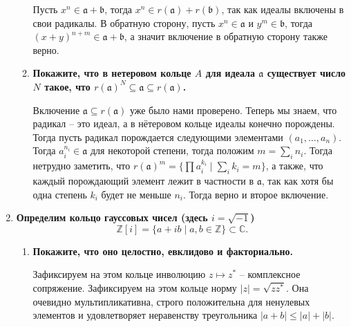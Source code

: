 \documentclass{article}
\begin{document}
\begin{enumerate}
\begin{enumerate}
                Пусть $x^n\in\mathfrak{a}+\mathfrak{b}$, тогда $x^n\in
                r(\mathfrak{a})+r(\mathfrak{b})$, так как идеалы включены в свои
                радикалы. В обратную сторону, пусть $x^n\in\mathfrak{a}$ и
                $y^m\in\mathfrak{b}$, тогда $(x+y)^{n+m}\in\mathfrak{a}+\mathfrak{b}$,
                а значит включение в обратную сторону также верно.

            \item \textbf{Покажите, что в нетеровом кольце $A$ для идеала $\mathfrak{a}$
                существует число $N$ такое, что $r(\mathfrak{a})^N\subseteq
                \mathfrak{a}\subseteq r(\mathfrak{a})$.}

                Включение $\mathfrak{a}\subseteq r(\mathfrak{a})$ уже было нами
                проверено. Теперь мы знаем, что радикал – это идеал, а в нётеровом
                кольце идеалы конечно порождены. Тогда пусть радикал порождается
                следующими элементами $(a_1,\ldots,a_n)$. Тогда $a_i^{n_i}\in
                \mathfrak{a}$ для некоторой степени, тогда положим $m=\sum_i n_i$.
                Тогда нетрудно заметить, что $r(\mathfrak{a})^m=\{\prod a_i^{k_i}
                \;|\;\sum_ik_i=m \}$, а также, что каждый порождающий элемент
                лежит в частности в $\mathfrak{a}$, так как хотя бы одна степень
                $k_i$ будет не меньше $n_i$. Тогда верно и второе включение.
        \end{enumerate}
        
    \item \textbf{Определим кольцо гауссовых чисел (здесь $i=\sqrt{−1}$)
        \[\mathbb{Z}[i]=\{a+ib\;|\;a,b\in\mathbb{Z}\}\subset\mathbb{C}.\]}
        \begin{enumerate}
            \item \textbf{Покажите, что оно целостно, евклидово и факториально.}

                Зафиксируем на этом кольце инволюцию $z\mapsto z^*$ – комплексное сопряжение.
                Зафиксируем на этом кольце норму $|z|=\sqrt{zz^*}$. Она очевидно
                мультипликативна, строго положительна для ненулевых элементов
                и удовлетворяет неравенству треугольника $|a+b|\leq |a|+|b|$.


\end{enumerate}
\end{enumerate}
\end{document}
